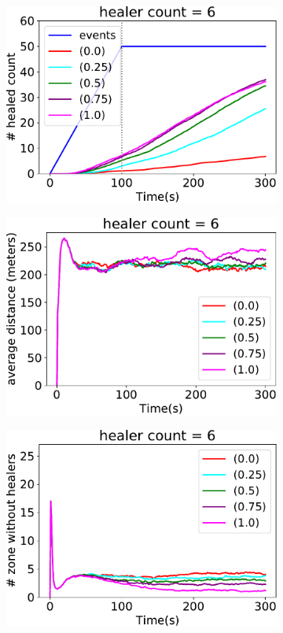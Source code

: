 \begin{figure}
\begin{subfigure}[b]{0.32\textwidth}
\includegraphics[width=\textwidth]{papers/mdpi2020/imgs/healed-6.pdf}
\end{subfigure}
\hfill
%
\begin{subfigure}[b]{0.32\textwidth}
\centering
\includegraphics[width=\textwidth]{papers/mdpi2020/imgs/avg-distance-from-leader-6.pdf}
\end{subfigure}
\hfill
%
\begin{subfigure}[b]{0.32\textwidth}
\centering
\includegraphics[width=\textwidth]{papers/mdpi2020/imgs/empty-zone-6.pdf}

\end{subfigure}
\end{figure}
